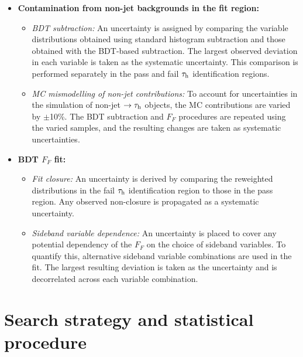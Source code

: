 \begin{itemize}
    \item \textbf{Contamination from non-jet backgrounds in the fit region:}
    \begin{itemize}
        \item \textit{BDT subtraction:} An uncertainty is assigned by comparing the variable distributions obtained using standard histogram subtraction and those obtained with the BDT-based subtraction. The largest observed deviation in each variable is taken as the systematic uncertainty. This comparison is performed separately in the pass and fail $\tau_\mathrm{h}$ identification regions.
        \item \textit{MC mismodelling of non-jet contributions:} To account for uncertainties in the simulation of non-jet $\rightarrow \tau_\mathrm{h}$ objects, the MC contributions are varied by $\pm$10\%. The BDT subtraction and $F_F$ procedures are repeated using the varied samples, and the resulting changes are taken as systematic uncertainties.
    \end{itemize}

    \item \textbf{BDT $F_F$ fit:}
    \begin{itemize}
        \item \textit{Fit closure:} An uncertainty is derived by comparing the reweighted distributions in the fail $\tau_\mathrm{h}$ identification region to those in the pass region. Any observed non-closure is propagated as a systematic uncertainty.
        \item \textit{Sideband variable dependence:} An uncertainty is placed to cover any potential dependency of the $F_F$ on the choice of sideband variables. To quantify this, alternative sideband variable combinations are used in the fit. The largest resulting deviation is taken as the uncertainty and is decorrelated across each variable combination.
    \end{itemize}
\end{itemize}

\section{Search strategy and statistical procedure}







